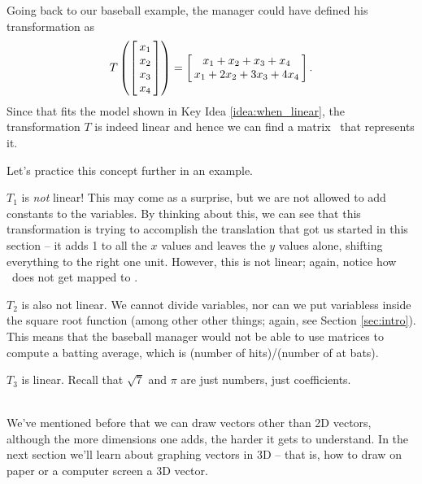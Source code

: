 Going back to our baseball example, the manager could have defined his transformation as $$T\left(\bmx{c}x_1\\x_2\\x_3\\x_4\emx\right) = \bmx{c}x_1+x_2+x_3+x_4 \\ x_1+2x_2+3x_3+4x_4\emx.$$ Since that fits the model shown in Key Idea \ref{idea:when_linear}, the transformation $T$ is indeed linear and hence we can find a matrix \TT\ that represents it.

Let's practice this concept further in an example.\\


{$T_1$ is \textit{not} linear! This may come as a surprise, but we are not allowed to add constants to the variables. By thinking about this, we can see that this transformation is trying to accomplish the translation that got us started in this section -- it adds 1 to all the $x$ values and leaves the $y$ values alone, shifting everything to the right one unit. However, this is not linear; again, notice how \zero\ does not get mapped to \zero.

$T_2$ is also not linear. We cannot divide variables, nor can we put variabless inside the square root function (among other other things; again, see Section \ref{sec:intro}). This means that the baseball manager would not be able to use matrices to compute a batting average, which is (number of hits)/(number of at bats).

$T_3$ is linear. Recall that $\sqrt{7}$ and $\pi$ are just numbers, just coefficients.
}\\

We've mentioned before that we can draw vectors other than 2D vectors, although the more dimensions one adds, the harder it gets to understand. In the next section we'll learn about graphing vectors in 3D -- that is, how to draw on paper or a computer screen a 3D vector.\\




